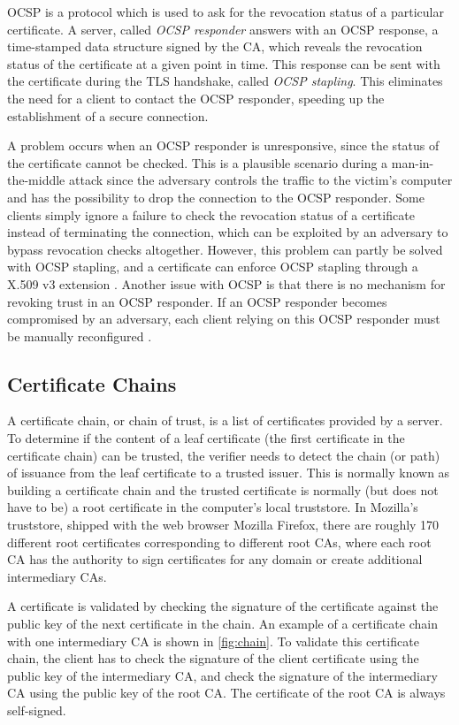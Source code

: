 \documentclass{style/kththesis}
\begin{document}
OCSP is a protocol which is used to ask for the revocation status of a particular certificate. A server, called \emph{OCSP responder} answers with an OCSP response, a time-stamped data structure signed by the CA, which reveals the revocation status of the certificate at a given point in time. This response can be sent with the certificate during the TLS handshake, called \emph{OCSP stapling}. This eliminates the need for a client to contact the OCSP responder, speeding up the establishment of a secure connection. 

A problem occurs when an OCSP responder is unresponsive, since the status of the certificate cannot be checked. This is a plausible scenario during a man-in-the-middle attack since the adversary controls the traffic to the victim's computer and has the possibility to drop the connection to the OCSP responder. Some clients simply ignore a failure to check the revocation status of a certificate instead of terminating the connection, which can be exploited by an adversary to bypass revocation checks altogether. However, this problem can partly be solved with OCSP stapling, and a certificate can enforce OCSP stapling through a X.509 v3 extension \cite{RFC7633}. Another issue with OCSP is that there is no mechanism for revoking trust in an OCSP responder. If an OCSP responder becomes compromised by an adversary, each client relying on this OCSP responder must be manually reconfigured \cite{Viega02}.

\subsection{Certificate Chains}
A certificate chain, or chain of trust, is a list of certificates provided by a server. To determine if the content of a leaf certificate (the first certificate in the certificate chain) can be trusted, the verifier needs to detect the chain (or path) of issuance from the leaf certificate to a trusted issuer. This is normally known as building a certificate chain and the trusted certificate is normally (but does not have to be) a root certificate in the computer's local truststore. In Mozilla's truststore, shipped with the web browser Mozilla Firefox, there are roughly 170 different root certificates \cite{Mozilla17} corresponding to different root CAs, where each root CA has the authority to sign certificates for any domain or create additional intermediary CAs. 

A certificate is validated by checking the signature of the certificate against the public key of the next certificate in the chain. An example of a certificate chain with one intermediary CA is shown in \cref{fig:chain}. To validate this certificate chain, the client has to check the signature of the client certificate using the public key of the intermediary CA, and check the signature of the intermediary CA using the public key of the root CA. The certificate of the root CA is always self-signed.
\end{document}
